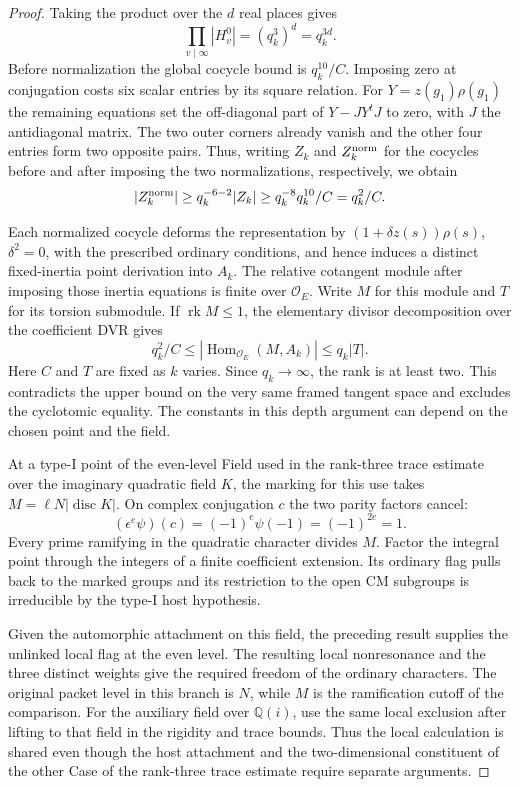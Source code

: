 \begin{proof}
Taking the product over the \(d\) real places gives
\[
 \prod_{v\mid\infty}|H_v^0|=(q_k^3)^d=q_k^{3d}.
\] Before normalization the global cocycle bound is \(q_k^{10}/C\). Imposing zero
at conjugation costs six scalar entries by its square relation.
For \(Y=z(g_1)\rho(g_1)\) the remaining equations set the
off-diagonal part of \(Y-JY^tJ\) to zero, with \(J\) the
antidiagonal matrix. The two outer corners already vanish
and the other four entries form two opposite pairs. Thus, writing \(Z_k\) and \(Z_k^{\rm norm}\) for the cocycles before and after imposing the two normalizations, respectively, we obtain
\[
 |Z_k^{\rm norm}|\ge q_k^{-6-2}|Z_k|
              \ge q_k^{-8}q_k^{10}/C=q_k^2/C .
\]

Each normalized cocycle deforms the representation by
\((1+\delta z(s))\rho(s)\), \(\delta^2=0\), with the
prescribed ordinary conditions, and hence induces a distinct
fixed-inertia point derivation into \(A_k\). The relative
cotangent module after imposing those inertia equations is
finite over \(\mathcal O_E\). Write \(M\) for this module and \(T\) for its torsion submodule. If \(\operatorname{rk}M\le1\), the elementary divisor decomposition over the coefficient DVR gives
\[
  q_k^2/C\le |\operatorname{Hom}_{\mathcal O_E}(M,A_k)|
      \le q_k |T| .
\]
Here \(C\) and \(T\) are fixed as \(k\) varies. Since \(q_k\to\infty\), the rank is at least two. This contradicts
the upper bound on the very same framed tangent space and
excludes the cyclotomic equality. The constants in this
depth argument can depend on the chosen point and the field.

At a type-I point of the even-level Field used in the rank-three trace estimate over the
imaginary quadratic field \(K\), the marking for this use takes
\(M=\ell N|\operatorname{disc}K|\). On complex conjugation \(c\) the two parity factors cancel:
\[
 (\epsilon^e\psi)(c)=(-1)^e\psi(-1)=(-1)^{2e}=1 .
\] Every prime ramifying in the quadratic
character divides \(M\). Factor the integral point through
the integers of a finite coefficient extension. Its ordinary
flag pulls back to the marked groups and its restriction to
the open CM subgroups is irreducible by the type-I host
hypothesis.

Given the automorphic attachment on this field, the preceding result supplies the unlinked local flag at the even level. The resulting local nonresonance and the three distinct weights give the required freedom of the ordinary characters. The original packet level in this branch
is \(N\), while \(M\) is the ramification cutoff of the comparison.
For the auxiliary field over \(\mathbb Q(i)\), use the same local exclusion after lifting to that field in the rigidity and trace bounds. Thus the local calculation is shared
even though the host attachment and the two-dimensional
constituent of the other Case of the rank-three trace estimate require separate
arguments.
\end{proof}
